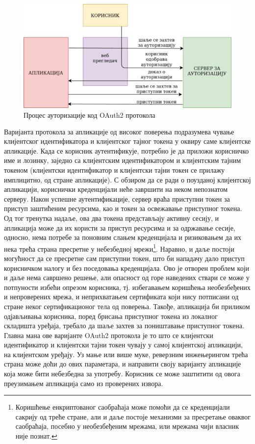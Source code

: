\documentclass[12pt,oneside]{memoir}
\begin{document}
\begin{figure}[!ht]
  \centering
  \includegraphics[scale=0.7]{slike/oauth2.png}
  \caption{Процес ауторизације код OAuth2 протокола}
  \label{fig:oauth2}
\end{figure}

Варијанта протокола за апликације од високог поверења подразумева чување клијентског идентификатора и клијентског тајног токена у оквиру саме клијентске апликације. Када се корисник аутентификује, потребно је да приложи корисничко име и лозинку, заједно са клијентским идентификатором и клијентским тајним токеном (клијентски идентификатор и клијентски тајни токен се прилажу имплицитно, од стране апликације). С обзиром да се ради о поузданој клијентској апликацији, кориснички креденцијали неће завршити на неком непознатом серверу. Након успешне аутентификације, сервер враћа приступни токен за приступ заштићеним ресурсима, као и токен за освежавање приступног токена. Од тог тренутка надаље, ова два токена представљају активну сесију, и апликација може да их користи за приступ ресурсима и за одржавање сесије, односно, нема потребе за поновним слањем креденцијала и ризиковањем да их нека трећа страна пресретне у небезбедној мрежи\footnote{Коришћење енкриптованог саобраћаја може помоћи да се креденцијали сакрију од треће стране, али и даље постоје механизми за пресретање оваквог саобраћаја, посебно у необезбеђеним мрежама, или мрежама чији власник није познат.}. Наравно, и даље постоји могућност да се пресретне сам приступни токен, што би нападачу дало приступ корисничком налогу и без поседовања креденцијала. Ово је отворен проблем који и даље нема савршено решење, али опасност од горе наведених ствари се може у потпуности избећи опрезом корисника, тј. избегавањем коришћења необезбеђених и непроверених мрежа, и неприхватањем сертификата који нису потписани од стране неког сертификационог тела од поверења. Такође, апликација би приликом одјављивања корисника, поред брисања приступног токена из локалног складишта уређаја, требало да шаље захтев за поништавање приступног токена. Главна мана ове варијанте OAuth2 протокола је то што се клијентски идентификатор и клијентски тајни токен чувају у самој клијентској апликацији, на клијентском уређају. Уз мање или више муке, реверзним инжењерингом трећа страна може доћи до ових параметара, и направити своју варијанту апликације која може бити небезбедна за употребу. Корисник се може заштитити од овога преузимањем апликација само из проверених извора.
\end{document}
